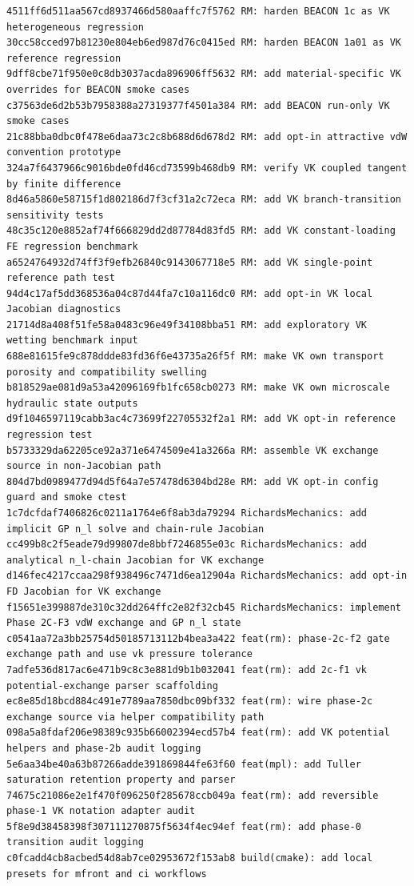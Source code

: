 \documentclass[10pt]{article}
\begin{document}
\begin{lstlisting}
4511ff6d511aa567cd8937466d580aaffc7f5762 RM: harden BEACON 1c as VK heterogeneous regression
30cc58cced97b81230e804eb6ed987d76c0415ed RM: harden BEACON 1a01 as VK reference regression
9dff8cbe71f950e0c8db3037acda896906ff5632 RM: add material-specific VK overrides for BEACON smoke cases
c37563de6d2b53b7958388a27319377f4501a384 RM: add BEACON run-only VK smoke cases
21c88bba0dbc0f478e6daa73c2c8b688d6d678d2 RM: add opt-in attractive vdW convention prototype
324a7f6437966c9016bde0fd46cd73599b468db9 RM: verify VK coupled tangent by finite difference
8d46a5860e58715f1d802186d7f3cf31a2c72eca RM: add VK branch-transition sensitivity tests
48c35c120e8852af74f666829dd2d87784d83fd5 RM: add VK constant-loading FE regression benchmark
a6524764932d74ff3f9efb26840c9143067718e5 RM: add VK single-point reference path test
94d4c17af5dd368536a04c87d44fa7c10a116dc0 RM: add opt-in VK local Jacobian diagnostics
21714d8a408f51fe58a0483c96e49f34108bba51 RM: add exploratory VK wetting benchmark input
688e81615fe9c878ddde83fd36f6e43735a26f5f RM: make VK own transport porosity and compatibility swelling
b818529ae081d9a53a42096169fb1fc658cb0273 RM: make VK own microscale hydraulic state outputs
d9f1046597119cabb3ac4c73699f22705532f2a1 RM: add VK opt-in reference regression test
b5733329da62205ce92a371e6474509e41a3266a RM: assemble VK exchange source in non-Jacobian path
804d7bd0989477d94d5f64a7e57478d6304bd28e RM: add VK opt-in config guard and smoke ctest
1c7dcfdaf7406826c0211a1764e6f8ab3da79294 RichardsMechanics: add implicit GP n_l solve and chain-rule Jacobian
cc499b8c2f5eade79d99807de8bbf7246855e03c RichardsMechanics: add analytical n_l-chain Jacobian for VK exchange
d146fec4217ccaa298f938496c7471d6ea12904a RichardsMechanics: add opt-in FD Jacobian for VK exchange
f15651e399887de310c32dd264ffc2e82f32cb45 RichardsMechanics: implement Phase 2C-F3 vdW exchange and GP n_l state
c0541aa72a3bb25754d50185713112b4bea3a422 feat(rm): phase-2c-f2 gate exchange path and use vk pressure tolerance
7adfe536d817ac6e471b9c8c3e881d9b1b032041 feat(rm): add 2c-f1 vk potential-exchange parser scaffolding
ec8e85d18bcd884c491e7789aa7850dbc09bf332 feat(rm): wire phase-2c exchange source via helper compatibility path
098a5a8fdaf206e98389c935b66002394ecd57b4 feat(rm): add VK potential helpers and phase-2b audit logging
5e6aa34be40a63b87266adde391869844fe63f60 feat(mpl): add Tuller saturation retention property and parser
74675c21086e2e1f470f096250f285678ccb049a feat(rm): add reversible phase-1 VK notation adapter audit
5f8e9d38458398f307111270875f5634f4ec94ef feat(rm): add phase-0 transition audit logging
c0fcadd4cb8acbed54d8ab7ce02953672f153ab8 build(cmake): add local presets for mfront and ci workflows
\end{lstlisting}
\end{document}
